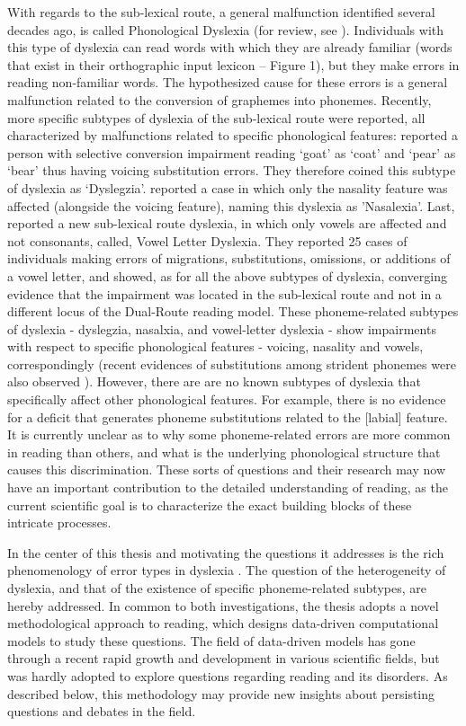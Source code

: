 With regards to the sub-lexical route, a general malfunction identified several decades ago, is called Phonological Dyslexia (for review, see \citealp{c96}). Individuals with this type of dyslexia can read words with which they are already familiar (words that exist in their orthographic input lexicon – Figure 1), but they make errors in reading non-familiar words. The hypothesized cause for these errors is a general malfunction related to the conversion of graphemes into phonemes. Recently, more specific subtypes of dyslexia of the sub-lexical route were reported, all characterized by malfunctions related to specific phonological features: \citet{Gvion2010} reported a person with selective conversion impairment reading ‘goat’ as ‘coat’ and ‘pear’ as ‘bear’ thus having voicing substitution errors. They therefore coined this subtype of dyslexia as ‘Dyslegzia’. \citet{Gvion2012} reported  a case in which only the nasality feature was affected (alongside the voicing feature), naming this dyslexia as 'Nasalexia'. Last, \citet{kf11} reported a new sub-lexical route dyslexia, in which only vowels are affected and not consonants, called, Vowel Letter Dyslexia. They reported 25 cases of individuals making errors of migrations, substitutions, omissions, or additions of a vowel letter, and showed, as for all the above subtypes of dyslexia, converging evidence that the impairment was located in the sub-lexical route and not in a different locus of the Dual-Route reading model. These phoneme-related subtypes of dyslexia - dyslegzia, nasalxia, and vowel-letter dyslexia - show impairments with respect to specific phonological features - voicing, nasality and vowels, correspondingly (recent evidences of substitutions among strident phonemes were also observed \citealp[unpublished]{friedmann}). However, there are are no known subtypes of dyslexia that specifically affect other phonological features. For example, there is no evidence for a deficit that generates phoneme substitutions related to the [labial] feature. It is currently unclear as to why some phoneme-related errors are more common in reading than others, and what is the underlying phonological structure that causes this discrimination. These sorts of questions and their research may now have an important contribution to the detailed understanding of reading, as the current scientific goal is to characterize the exact building blocks of these intricate processes.

In the center of this thesis and motivating the questions it addresses is the rich phenomenology of error types in dyslexia . The question of the heterogeneity of dyslexia, and that of the existence of specific phoneme-related subtypes, are hereby addressed. In common to both investigations, the thesis adopts a novel methodological approach to reading, which designs data-driven computational models to study these questions. The field of data-driven models has gone through a recent rapid growth and development in various scientific fields, but was hardly adopted to explore questions regarding reading and its disorders. As described below, this methodology may provide new insights about persisting questions and debates in the field.

